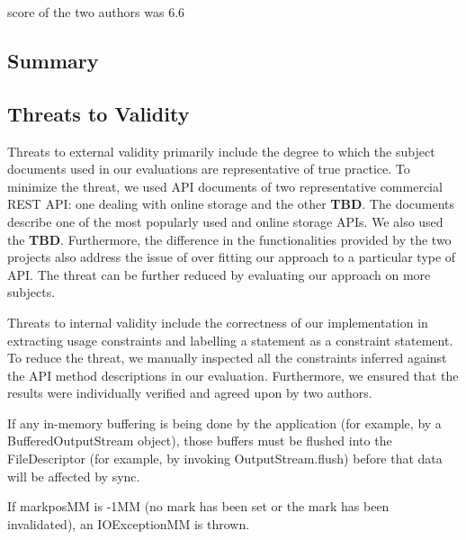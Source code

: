  score of the two authors was 6.6 


\subsection{Summary}
\label{sub:summary}

\subsection{Threats to Validity}
\label{sub:threats_to_validity}
Threats to external validity primarily include the degree to which the subject documents used in our evaluations are representative of true practice. To minimize the threat, we used API documents of two representative commercial REST API: one dealing with online storage and the other \textbf{TBD}. The \amazon documents describe one of the most popularly used and online storage APIs. We also used the \textbf{TBD}. Furthermore, the difference in the functionalities provided by the two projects also address the issue of over fitting our approach to a particular type of API. The threat can be further reduced by evaluating our approach on more subjects. 

Threats to internal validity include the correctness of our implementation in extracting usage constraints and labelling a statement as a constraint statement. To reduce the threat, we manually inspected all the constraints inferred against the API method descriptions in our evaluation. Furthermore, we ensured that the results were individually verified and agreed
upon by two authors.




If any in-memory buffering is being done by the application (for example, by a BufferedOutputStream object), those buffers must be flushed into the FileDescriptor (for example, by invoking OutputStream.flush) before that data will be affected by sync.


If markposMM is -1MM (no mark has been set or the mark has been invalidated), an IOExceptionMM is thrown.